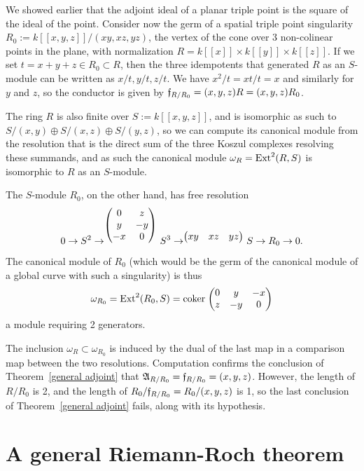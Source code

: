 \begin{example}\label{nongorenstein}
We showed earlier that the adjoint ideal of a planar triple point is the square of the ideal of the point. Consider now
  the germ of a spatial triple point singularity $R_0 := k[[x,y,z]]/(xy, xz,yz)$, the vertex of the cone over 3
 non-colinear points in the plane, with normalization $R = k[[x]]\times k[[y]]\times k[[z]]$.
 If we set $t = x+y+z\in R_0\subset R$, then the three idempotents that generated $R$ as an $S$-module
 can be written as $x/t, y/t, z/t$. We have $x^2/t = xt/t= x$ and similarly for $y$ and $z$, so
 the conductor is given by $\mathfrak f_{R/R_0} = (x,y,z)R = (x,y,z)R_0$.
 
 The ring $R$ is also finite over $S := k[[x,y,z]]$, and is isomorphic as such to 
 $S/(x,y)\oplus S/(x,z) \oplus S/(y,z)$, so we can compute its canonical module from the
 resolution that is the direct sum of the three Koszul complexes resolving these summands, and 
 as such the canonical module $\omega_R = {\rm{Ext}}^2(R,S)$ is isomorphic to $R$ as an $S$-module.
 

 The $S$-module $R_0$, on the other hand,   has free resolution
 $$
 0\to S^2\to^{
	\begin{pmatrix}
 0&z\\
 y&-y\\
 -x&0
\end{pmatrix}}
 S^3 \to^{
\begin{pmatrix}
 xy&xz&yz
\end{pmatrix}}
 S \to R_0 \to 0. 
 $$
The canonical module of $R_0$ (which would be the germ of the canonical module of a global curve with such a singularity) is thus 
 $$
 \omega_{R_0} = {\rm{Ext}}^2(R_0, S) = 
 {\rm{coker}\kern1pt} 
\begin{pmatrix}
 0&y&-x\\z&-y&0
\end{pmatrix}
$$
a module requiring 2 generators.
\end{example}
The inclusion $\omega_{R} \subset \omega_{R_0}$ is  induced by the 
dual of the last map in a comparison map between the two resolutions. Computation
confirms the conclusion of Theorem~\ref{general adjoint} that $\mathfrak A_{R/R_0} = \mathfrak f_{R/R_0} = (x,y,z)$. However, the length of $R/R_0$ is 2, and the length of $R_0/\mathfrak f_{R/R_0} = R_0/(x,y,z)$ is  1, so the
last conclusion of Theorem~\ref{general adjoint} fails, along with its hypothesis.

\section{A general Riemann-Roch theorem}

